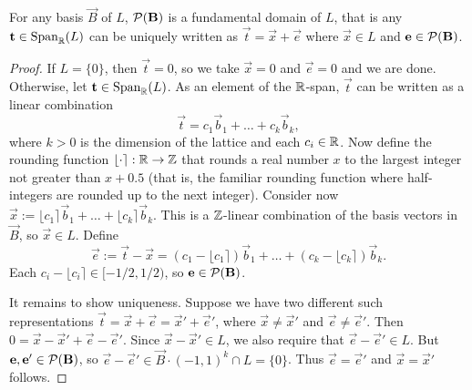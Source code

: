 \begin{proposition}\label{prop:fundamentalDomain} For any basis $\vec B$ of $L$, $\mathcal P(\mathbf{B})$ is a fundamental domain of $L$, that is any $\mathbf{t} \in \operatorname{Span}_{\mathbb{R}}(L)$ can be uniquely written as $\vec t = \vec x + \vec e$ where $\vec x \in L$ and $\mathbf{e} \in \mathcal P(\mathbf{B})$.
\end{proposition}
\begin{proof}
If $L = \{ 0 \}$, then $\vec t = 0$, so we take $\vec x = 0$ and $\vec e = 0$ and we are done.
Otherwise, let $\mathbf{t} \in \operatorname{Span}_{\mathbb{R}}(L)$.
As an element of the $\mathbb{R}$-span, $\vec t$ can be written as a linear combination
\[
\vec t = c_1 \vec b_1 + \ldots + c_k \vec b_k,
\]
where $k >0$ is the dimension of the lattice and each $c_i \in \mathbb{R}$.
Now define the rounding function $\lfloor \cdot \rceil : \mathbb{R} \rightarrow \mathbb{Z}$ that rounds a real number $x$ to the largest integer not greater than $x + 0.5$ (that is, the familiar rounding function where half-integers are rounded up to the next integer).
Consider now $\vec x := \lfloor c_1 \rceil \vec b_1 + \ldots + \lfloor c_k \rceil \vec b_k$.
This is a $\mathbb{Z}$-linear combination of the basis vectors in $\vec B$, so $\vec x \in L$.
Define \[\vec e := \vec t - \vec x = (c_1 - \lfloor c_1 \rceil ) \vec b_1 + \ldots + (c_k - \lfloor c_k \rceil)  \vec b_k.\]
Each $c_i - \lfloor c_i \rceil \in [- 1/2 , 1/2)$, so $\mathbf{e} \in \mathcal P(\mathbf{B})$.

It remains to show uniqueness.
Suppose we have two different such representations $\vec t = \vec x + \vec e = \vec x' + \vec e'$, where $\vec x \neq \vec x'$ and $\vec e \neq \vec e'$.
Then $0 = \vec x - \vec x' + \vec e - \vec e'$.
Since $\vec x - \vec x' \in L$, we also require that $\vec e - \vec e' \in L$.
But $\mathbf{e}, \mathbf{e}' \in \mathcal P(\mathbf{B})$, so $\vec e - \vec e' \in \vec B \cdot (-1, 1)^k \cap L = \{ 0 \}$.
Thus $\vec e = \vec e'$ and $\vec x = \vec x'$ follows.
\end{proof}

